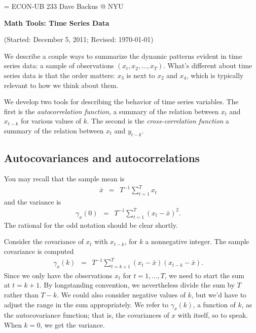 \documentclass[11pt]{article}
\begin{document}
\parskip=\bigskipamount
\parindent=0.0in
\thispagestyle{empty}
{\large ECON-UB 233 \hfill Dave Backus @ NYU}

\bigskip\bigskip
\centerline{\Large \bf Math Tools:  Time Series Data}
\centerline{(Started: December 5, 2011; Revised: \today)}

\bigskip
We describe a couple ways to summarize the dynamic patterns
evident in time series data:
a sample of observations
$ (x_t, x_2, \ldots, x_T)$.
What's different about time series data is that the order matters:
$x_3$ is next to $x_2$ and $x_4$,
which is typically relevant to how we think about them.

We develop two tools for describing the behavior of time series variables.
The first is the {\it autocorrelation function\/},
a summary of the relation between $x_t$ and $x_{t-k}$
for various values of $k$.
The second is the {\it cross-correlation function\/}
a summary of the relation between $x_t$ and $y_{t-k}$.


\begin{comment}
\subsection*{Stationarity}

We'll be talking about sample moments, but the sample moments only
make sense if we have some underlying distribution theory.
Distribution of $x_t$ doesn't depend on $t$.
For example, its mean and variance don't depend on $t$.
Ditto joint distribution $ (x_t, x_{t+1}, x_{t+k} ,...)$ ...

That means moments don't depend on $t$, including mean and variance.
\end{comment}

\subsection*{Autocovariances and autocorrelations}

You may recall that the sample mean is
\begin{eqnarray*}
    \bar{x} &=& T^{-1} \sum_{t=1}^T x_{t}
\end{eqnarray*}
and the variance is
\begin{eqnarray*}
    \gamma_x(0)  &=&   T^{-1} \sum_{t=1}^T (x_{t}-\bar{x})^2 .
\end{eqnarray*}
The rational for the odd notation should be clear shortly.


Consider the covariance of $x_t$ with $x_{t-k}$,
for $k$ a nonnegative integer.
The sample covariance is computed
\begin{eqnarray*}
    \gamma_x(k)  &=&  T^{-1} \sum_{t=k+1}^T (x_{t}-\bar{x})(x_{t-k}-\bar{x}) .
\end{eqnarray*}
Since we only have the observations $x_t$ for $t=1,...,T$,
we need to start the sum at $t=k+1$.
By longstanding convention, we nevertheless divide the sum by $T$ rather than $T-k$.
We could also consider negative values of $k$, but we'd have to adjust the
range in the sum appropriately.
We refer to $\gamma_x(k)$, a function of $k$, as the autocovariance function;
that is, the covariances of $x$ with itself, so to speak.
When $k=0$, we get the variance.
\end{document}
